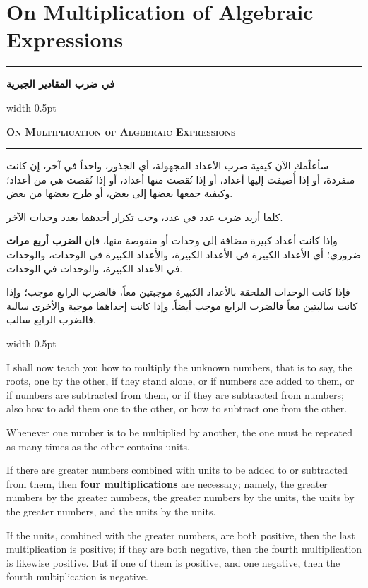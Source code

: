 \documentclass[10pt,a4paper]{book}
\newlength{\colwidth}
\newcommand{\bilingualpair}[2]{%
  \noindent
  \begin{minipage}[t]{\colwidth}
  \begin{flushright}
  \vspace{0pt}
  {\arabicfont\small #1}
  \end{flushright}
  \end{minipage}%
  \hfill\textcolor{columnsepclr}{\vrule width 0.5pt}\hfill
  \begin{minipage}[t]{\colwidth}
  \vspace{0pt}
  {\small #2}
  \end{minipage}%
  \par\vspace{0.6em}
}
\newcommand{\bilingualsectionheader}[2]{%
  \par\vspace{0.8em}
  \noindent
  \begin{minipage}[t]{\colwidth}
  \begin{flushright}
  \textbf{\arabicfont #1}
  \end{flushright}
  \end{minipage}%
  \hfill\textcolor{columnsepclr}{\vrule width 0.5pt}\hfill
  \begin{minipage}[t]{\colwidth}
  \textbf{\textsc{#2}}
  \end{minipage}%
  \par\vspace{0.5em}
}
\begin{document}
\chapter{On Multiplication of Algebraic Expressions}
\label{ch:multiplication}

\noindent\textcolor{columnsepclr}{\rule{\textwidth}{0.6pt}}\par\vspace{0.3em}
\bilingualsectionheader{في ضرب المقادير الجبرية}{On Multiplication of Algebraic Expressions}
\noindent\textcolor{columnsepclr}{\rule{\textwidth}{0.6pt}}\par\vspace{0.5em}

\bilingualpair{
سأعلّمك الآن كيفية ضرب الأعداد المجهولة، أي الجذور،
واحداً في آخر، إن كانت منفردة، أو إذا أُضيفت إليها أعداد، أو
إذا نُقصت منها أعداد، أو إذا نُقصت هي من أعداد؛ وكيفية
جمعها بعضها إلى بعض، أو طرح بعضها من بعض.

كلما أريد ضرب عدد في عدد، وجب تكرار أحدهما بعدد وحدات
الآخر.

وإذا كانت أعداد كبيرة مضافة إلى وحدات أو منقوصة منها،
فإن \textbf{الضرب أربع مرات} ضروري؛ أي الأعداد الكبيرة في
الأعداد الكبيرة، والأعداد الكبيرة في الوحدات، والوحدات في
الأعداد الكبيرة، والوحدات في الوحدات.

فإذا كانت الوحدات الملحقة بالأعداد الكبيرة موجبتين معاً، فالضرب
الرابع موجب؛ وإذا كانت سالبتين معاً فالضرب الرابع موجب أيضاً.
وإذا كانت إحداهما موجبة والأخرى سالبة فالضرب الرابع سالب.
}{
I shall now teach you how to multiply the unknown numbers, that is to
say, the roots, one by the other, if they stand alone, or if numbers are
added to them, or if numbers are subtracted from them, or if they are
subtracted from numbers; also how to add them one to the other, or how to
subtract one from the other.

Whenever one number is to be multiplied by another, the one must be repeated
as many times as the other contains units.

If there are greater numbers combined with units to be added to or subtracted
from them, then \textbf{four multiplications} are necessary; namely, the
greater numbers by the greater numbers, the greater numbers by the units, the
units by the greater numbers, and the units by the units.

If the units, combined with the greater numbers, are both positive, then the
last multiplication is positive; if they are both negative, then the fourth
multiplication is likewise positive. But if one of them is positive, and one
negative, then the fourth multiplication is negative.
}
\end{document}
